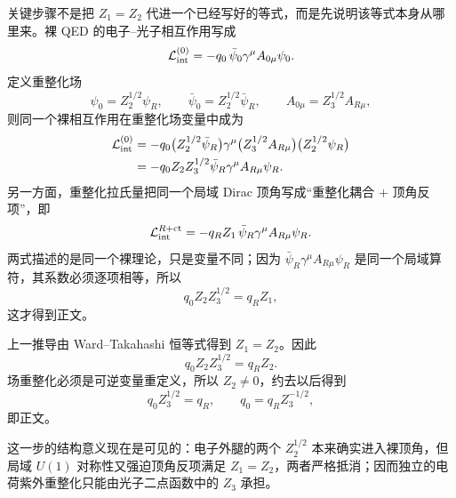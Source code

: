 \begin{derivation}
关键步骤不是把 \(Z_1=Z_2\) 代进一个已经写好的等式，而是先说明该等式本身从哪里来。裸 QED 的电子--光子相互作用写成
\begin{equation*}
\mathcal L_{\rm int}^{(0)}
=-q_0\,\bar\psi_0\gamma^\mu A_{0\mu}\psi_0.
\end{equation*}
定义重整化场
\begin{equation*}
\psi_0=Z_2^{1/2}\psi_R,
\qquad
\bar\psi_0=Z_2^{1/2}\bar\psi_R,
\qquad
A_{0\mu}=Z_3^{1/2}A_{R\mu},
\end{equation*}
则同一个裸相互作用在重整化场变量中成为
\begin{align*}
\mathcal L_{\rm int}^{(0)}
&=-q_0
\bigl(Z_2^{1/2}\bar\psi_R\bigr)
\gamma^\mu
\bigl(Z_3^{1/2}A_{R\mu}\bigr)
\bigl(Z_2^{1/2}\psi_R\bigr)\\
&=-q_0Z_2Z_3^{1/2}
\bar\psi_R\gamma^\mu A_{R\mu}\psi_R.
\end{align*}
另一方面，重整化拉氏量把同一个局域 Dirac 顶角写成“重整化耦合 + 顶角反项”，即
\begin{equation*}
\mathcal L_{\rm int}^{R+\rm ct}
=-q_R Z_1\,
\bar\psi_R\gamma^\mu A_{R\mu}\psi_R.
\end{equation*}
两式描述的是同一个裸理论，只是变量不同；因为
\(\bar\psi_R\gamma^\mu A_{R\mu}\psi_R\)
是同一个局域算符，其系数必须逐项相等，所以
\begin{equation*}
q_0Z_2Z_3^{1/2}=q_RZ_1,
\end{equation*}
这才得到正文。

上一推导由 Ward--Takahashi 恒等式得到 \(Z_1=Z_2\)。因此
\begin{equation*}
q_0Z_2Z_3^{1/2}=q_RZ_2.
\end{equation*}
场重整化必须是可逆变量重定义，所以 \(Z_2\neq0\)，约去以后得到
\begin{equation*}
q_0Z_3^{1/2}=q_R,
\qquad
q_0=q_RZ_3^{-1/2},
\end{equation*}
即正文。

这一步的结构意义现在是可见的：电子外腿的两个 \(Z_2^{1/2}\) 本来确实进入裸顶角，但局域 \(U(1)\) 对称性又强迫顶角反项满足 \(Z_1=Z_2\)，两者严格抵消；因而独立的电荷紫外重整化只能由光子二点函数中的 \(Z_3\) 承担。
\end{derivation}
